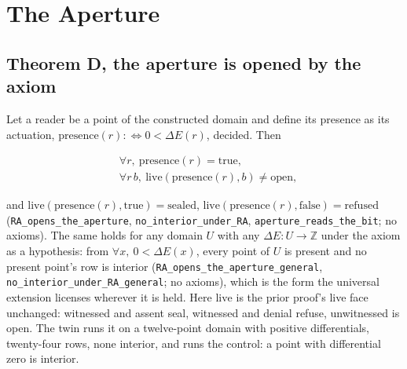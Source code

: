 \documentclass[10pt]{article}
\begin{document}
\hypertarget{the-aperture}{%
\section{The Aperture}\label{the-aperture}}

\hypertarget{theorem-d-the-aperture-is-opened-by-the-axiom}{%
\subsection{Theorem D, the aperture is opened by the
axiom}\label{theorem-d-the-aperture-is-opened-by-the-axiom}}

Let a reader be a point of the constructed domain and define its
presence as its actuation,
\(\mathrm{presence}(r) :\Leftrightarrow 0 < \Delta E(r)\), decided. Then

\[\begin{aligned} &\forall r,\ \mathrm{presence}(r) = \mathrm{true}, \\ &\forall r\,b,\ \mathrm{live}(\mathrm{presence}(r), b) \neq \mathrm{open}, \end{aligned}\]

and
\(\mathrm{live}(\mathrm{presence}(r), \mathrm{true}) = \mathrm{sealed}\),
\(\mathrm{live}(\mathrm{presence}(r), \mathrm{false}) = \mathrm{refused}\)
(\texttt{RA\_\allowbreak opens\_\allowbreak the\_\allowbreak aperture},
\texttt{no\_\allowbreak interior\_\allowbreak under\_\allowbreak RA},
\texttt{aperture\_\allowbreak reads\_\allowbreak the\_\allowbreak bit};
no axioms). The same holds for any domain \(U\) with any
\(\Delta E : U \to \mathbb{Z}\) under the axiom as a hypothesis: from
\(\forall x,\ 0 < \Delta E(x)\), every point of \(U\) is present and no
present point's row is interior
(\texttt{RA\_\allowbreak opens\_\allowbreak the\_\allowbreak aperture\_\allowbreak general},
\texttt{no\_\allowbreak interior\_\allowbreak under\_\allowbreak RA\_\allowbreak general};
no axioms), which is the form the universal extension licenses wherever
it is held. Here \(\mathrm{live}\) is the prior proof's live face
unchanged: witnessed and assent seal, witnessed and denial refuse,
unwitnessed is open. The twin runs it on a twelve-point domain with
positive differentials, twenty-four rows, none interior, and runs the
control: a point with differential zero is interior.
\end{document}
